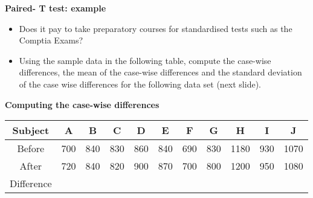 \documentclass[a4paper,12pt]{article}
\begin{document}
\textbf{Paired- T  test: example}
\begin{itemize}
\item Does it pay to take preparatory courses for standardised tests such as the Comptia Exams?
\item Using the sample data in the following table, compute the case-wise differences, the mean of the case-wise differences and the standard deviation of the case wise differences for the following data set (next slide).
\end{itemize}



\textbf{Computing the case-wise differences}
\begin{center}
\begin{tabular}{|c|c|c|c|c|c|c|c|c|c|c|}
\hline
Subject& A& B& C& D& E &F &G &H &I &J\\  \hline
Before &700& 840& 830& 860& 840 &690 &830& 1180& 930& 1070\\  \hline
After &720 &840 &820 &900 &870 &700 &800& 1200& 950& 1080\\  \hline
Difference &  & & & & & & & & & \\
\hline
\end{tabular}
\end{center}
\end{document}

